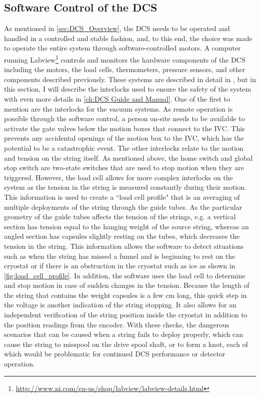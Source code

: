 \subsection*{Software Control of the DCS}
\label{ssec:Software Control of the DCS}
As mentioned in \autoref{sec:DCS_Overview}, the DCS needs to be operated and handled in a controlled and stable fashion, and, to this end, the choice was made to operate the entire system through software-controlled motors.
A computer running Labview\footnote{\RaggedRight\url{http://www.ni.com/en-us/shop/labview/labview-details.html}} controls and monitors the hardware components of the DCS including the motors, the load cells, thermometers, pressure sensors, and other components described previously.
These systems are described in detail in \cite{JeremyThesis}, but in this section, I will describe the interlocks used to ensure the safety of the system with even more details in \autoref{ch:DCS Guide and Manual}.
One of the first to mention are the interlocks for the vacuum systems.
As remote operation is possible through the software control, a person on-site needs to be available to activate the gate valves below the motion boxes that connect to the IVC.
This prevents any accidental openings of the motion box to the IVC, which has the potential to be a catastrophic event.
The other interlocks relate to the motion and tension on the string itself.
As mentioned above, the home switch and global stop switch are two-state switches that are used to stop motion when they are triggered.
However, the load cell allows for more complex interlocks on the system as the tension in the string is measured constantly during their motion.
This information is used to create a ``load cell profile" that is an averaging of multiple deployments of the string through the guide tubes.
As the particular geometry of the guide tubes affects the tension of the strings, e.g. a vertical section has tension equal to the hanging weight of the source string, whereas an angled section has capsules slightly resting on the tubes, which decreases the tension in the string.
This information allows the software to detect situations such as when the string has missed a funnel and is beginning to rest on the cryostat or if there is an obstruction in the cryostat such as ice as shown in \autoref{fig:load_cell_profile}.
In addition, the software uses the load cell to determine and stop motion in case of sudden changes in the tension.
Because the length of the string that contains the weight capsules is a few cm long, this quick step in the voltage is another indication of the string stopping. 
It also allows for an independent verification of the string position inside the cryostat in addition to the position readings from the encoder.
With these checks, the dangerous scenarios that can be caused when a string fails to deploy properly, which can cause the string to misspool on the drive spool shaft, or to form a knot, each of which would be problematic for continued DCS performance or detector operation.

